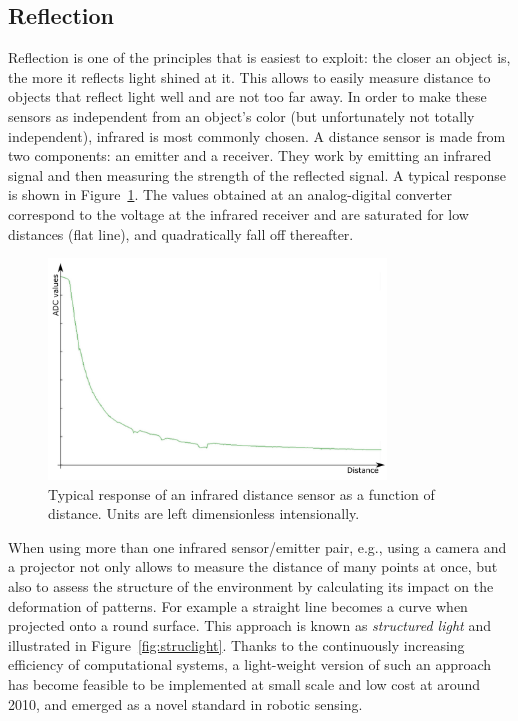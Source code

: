 \subsection{Reflection}
Reflection is one of the principles that is easiest to exploit: the closer an object is, the more it reflects light shined at it. This allows to easily measure distance to objects that reflect light well and are not too far away. In order to make these sensors as independent from an object's color (but unfortunately not totally independent), infrared is most commonly chosen. A distance sensor is made from two components: an emitter and a receiver. They work by emitting an infrared signal and then measuring the strength of the reflected signal. A typical response is shown in Figure~\ref{fig:epuckir}. The values obtained at an analog-digital converter correspond to the voltage at the infrared receiver and are saturated for low distances (flat line), and quadratically fall off thereafter.

\begin{figure}
	\centering
		\includegraphics[width=0.8\textwidth]{figs/epuckirsensor.png}
	\caption{Typical response of an infrared distance sensor as a function of distance. Units are left dimensionless intensionally.}
	\label{fig:epuckir}
\end{figure}

When using more than one infrared sensor/emitter pair, e.g., using a camera and a projector not only allows to measure the distance of many points at once, but also to assess the structure of the environment by calculating its impact on the deformation of patterns. For example a straight line becomes a curve when projected onto a round surface. This approach is known as \emph{structured light} and illustrated in Figure~\ref{fig:struclight}. Thanks to the continuously increasing efficiency of computational systems, a light-weight version of such an approach has become feasible to be implemented at small scale and low cost at around 2010, and emerged as a novel standard in robotic sensing.

